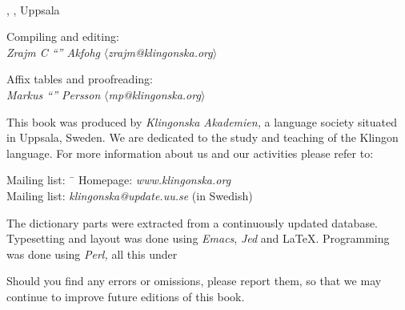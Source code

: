 \begin{center}
  \\
  \edition{}, \compiledate{}, Uppsala

  \vspace{4mm}
  \small Compiling and editing: \\
  \textit{Zrajm C ``'' Akfohg}
  $\langle$\textit{zrajm@klingonska.org}$\rangle$ 

  \vspace{2mm}
  Affix tables and proofreading:\\
  \textit{Markus ``'' Persson}
  $\langle$\textit{mp@klingonska.org}$\rangle$
\end{center}


\small\noindent This book was produced by \textit{Kling\-on\-ska
Aka\-demi\-en,} a language society situated in Uppsala, Sweden. We are
dedicated to the study and teaching of the Klingon language. For more
information about us and our activities please refer to:

\begin{tabbing}
\indent Mailing list: \ \= \kill
\indent Homepage: \> \textit{www.klingonska.org}\\
\indent Mailing list: \> \textit{klingonska@update.uu.se} (in Swedish)
\end{tabbing}

\noindent The dictionary parts were extracted from a continuously
updated database. Typesetting and layout was done using
\textit{Emacs}, \textit{Jed} and \LaTeX. Programming was done using
\textit{Perl,} all this under 

Should you find any errors or omissions, please report them, so that
we may continue to improve future editions of this book.

\newpage
\normalsize
